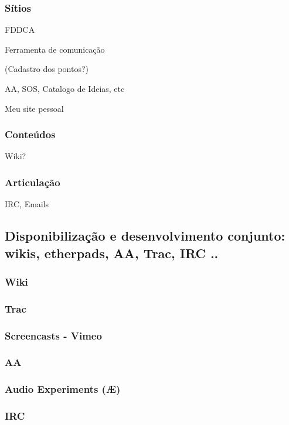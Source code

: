       \subsubsection{Sítios}

      FDDCA

      Ferramenta de comunicação

      (Cadastro dos pontos?)

      AA, SOS, Catalogo de Ideias, etc

      Meu site pessoal


      \subsubsection{Conteúdos}

      Wiki?

      \subsubsection{Articulação}

      IRC, Emails

\subsection{Disponibilização e desenvolvimento conjunto: wikis, etherpads, AA, Trac, IRC ..}

\subsubsection{Wiki}

\subsubsection{Trac}

\subsubsection{Screencasts - Vimeo}

\subsubsection{AA}

\subsubsection{Audio Experiments (Æ)}

\subsubsection{IRC}

